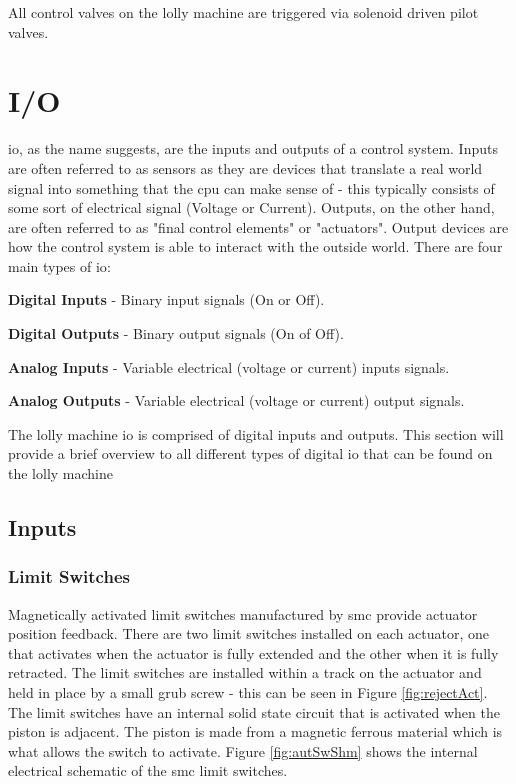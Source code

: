     All control valves on the lolly machine are triggered via solenoid driven pilot valves.

\section{I/O}
    
    \acrfull{io}, as the name suggests, are the inputs and outputs of a control system. Inputs are often referred to as sensors as they are devices that translate a real world signal into something that the \acrshort{cpu} can make sense of - this typically consists of some sort of electrical signal (Voltage or Current). Outputs, on the other hand, are often referred to as "final control elements" or "actuators". Output devices are how the control system is able to interact with the outside world.\newline
    There are four main types of \acrshort{io}:

    \begin{description}
    \item\textbf{Digital Inputs} - Binary input signals (On or Off).
    \item\textbf{Digital Outputs} - Binary output signals (On of Off).
    \item\textbf{Analog Inputs} - Variable electrical (voltage or current) inputs signals.
    \item\textbf{Analog Outputs} - Variable electrical (voltage or current) output signals.
    \end{description}
    
    The lolly machine \acrshort{io} is comprised of digital inputs and outputs. This section will provide a brief overview to all different types of digital \acrshort{io} that can be found on the lolly machine

\subsection{Inputs}
    \subsubsection{Limit Switches}
        Magnetically activated limit switches manufactured by \acrshort{smc} provide actuator position feedback. There are two limit switches installed on each actuator, one that activates when the actuator is fully extended and the other when it is fully retracted. The limit switches are installed within a track on the actuator and held in place by a small grub screw - this can be seen in Figure \ref{fig:rejectAct}.
        The limit switches have an internal solid state circuit that is activated when the piston is adjacent. The piston is made from a magnetic ferrous material which is what allows the switch to activate. 
        Figure \ref{fig:autSwShm} shows the internal electrical schematic of the \acrshort{smc} limit switches.
        
